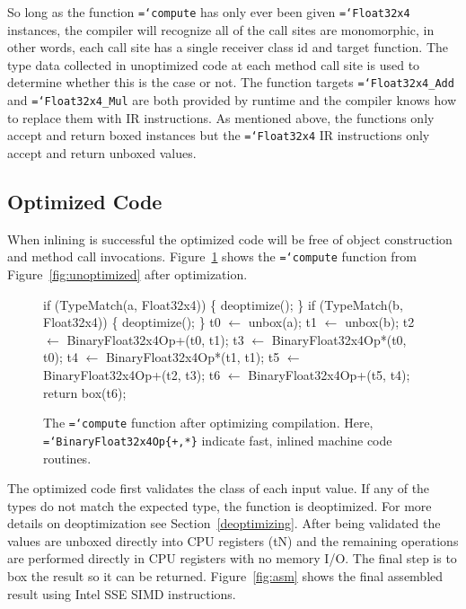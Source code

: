 \documentclass{sigplanconf}
\newcommand{\ttt}[1]{{\texttt{\hyphenchar\font=`\-\relax #1}}}%
\begin{document}
So long as the function \ttt{compute} has only ever been given \ttt{Float32x4}
instances, the compiler will recognize all of the call sites are monomorphic, in
other words, each call site has a single receiver class id and target function.
The type data collected in unoptimized code at each method call site is used to
determine whether this is the case or not. The function targets
\ttt{Float32x4\_Add} and \ttt{Float32x4\_Mul} are both provided by runtime and
the compiler knows how to replace them with IR instructions. As mentioned above,
the functions only accept and return boxed instances but the \ttt{Float32x4} IR
instructions only accept and return unboxed values.

\subsection{Optimized Code}

When inlining is successful the optimized code will be free of object
construction and method call invocations. Figure~\ref{fig:optimized} shows
the \ttt{compute} function from Figure~\ref{fig:unoptimized} after optimization.

\begin{figure}
\begin{small}
\begin{program}[style=tt, number=true]
if\tab{} (\!TypeMatch(a, Float32x4)) \{
  deoptimize();\untab{}
\}
if\tab{} (\!TypeMatch(b, Float32x4)) \{
  deoptimize();\untab{}
\}
t0 $\leftarrow$ unbox(a);
t1 $\leftarrow$ unbox(b);
t2 $\leftarrow$ BinaryFloat32x4Op+(t0, t1);
t3 $\leftarrow$ BinaryFloat32x4Op*(t0, t0);
t4 $\leftarrow$ BinaryFloat32x4Op*(t1, t1);
t5 $\leftarrow$ BinaryFloat32x4Op+(t2, t3);
t6 $\leftarrow$ BinaryFloat32x4Op+(t5, t4);
return box(t6);
\end{program}
\end{small}
\caption{The \ttt{compute} function after optimizing compilation. Here,
\ttt{BinaryFloat32x4Op\{+,*\}} indicate fast, inlined machine code routines.}
\label{fig:optimized}
\end{figure}

The optimized code first validates the class of each input value. If any of the
types do not match the expected type, the function is deoptimized. For more
details on deoptimization see Section~\ref{deoptimizing}. After being validated
the values are unboxed directly into CPU registers (tN) and the remaining
operations are performed directly in CPU registers with no memory I/O. The final
step is to box the result so it can be returned. Figure~\ref{fig:asm} shows the
final assembled result using Intel SSE SIMD instructions.
\end{document}
